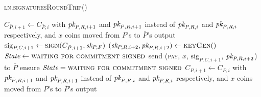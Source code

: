 \begin{center}
  \begin{processbox}{\textsc{ln}.\textsc{signaturesRoundTrip}()}
    \begin{algorithmic}[1]
      \State $C_{\bar{P}, i+1} \gets C_{\bar{P}, i}$ with $\textit{pk}_{P, R, i+1}$ and
      $\textit{pk}_{\bar{P}, R, i+1}$ instead of $\textit{pk}_{P, R, i}$ and $\textit{pk}_{\bar{P}, R, i}$
      respectively, and $x$ coins moved from $P$'s to $\bar{P}$'s output
      \label{code:ln:pay:signatures:new-comm}
      \State $\mathrm{sig}_{P, C, i+1} \gets \textsc{sign}(C_{\bar{P}, i+1},
      \textit{sk}_{P, F})$ 
      \label{code:ln:pay:signatures:sign-new-comm}
      \State $(\textit{sk}_{P, R, i+2}, \textit{pk}_{P, R, i+2}) \gets \textsc{keyGen}()$
      \State $\itistate \gets \textsc{waiting for commitment signed}$
      \State send (\textsc{pay}, $x$, $\mathrm{sig}_{P, C, i+1}$, $\textit{pk}_{P, R,
      i+2}$) to $\bar{P}$
      \label{code:ln:pay:signatures:pay}
      \State {}
      \State {}
      \State {}
      \State {}
      \label{code:ln:pay:signatures:verify}
      \State {}
      \State {} 
      \State {}
      \State {}
      \State {}
      \State {}
      \State {}
      \State ensure $\itistate = \textsc{waiting for commitment signed}$
      \State $C_{P, i+1} \gets C_{P, i}$ with $\textit{pk}_{\bar{P}, R, i+1}$ and $\textit{pk}_{P,
      R, i+1}$ instead of $\textit{pk}_{\bar{P}, R, i}$ and $\textit{pk}_{P, R, i}$ respectively,
      and $x$ coins moved from $P$'s to $\bar{P}$'s output
    \end{algorithmic}
  \end{processbox}
  \label{code:ln:pay:signatures}
\end{center} \ \\

